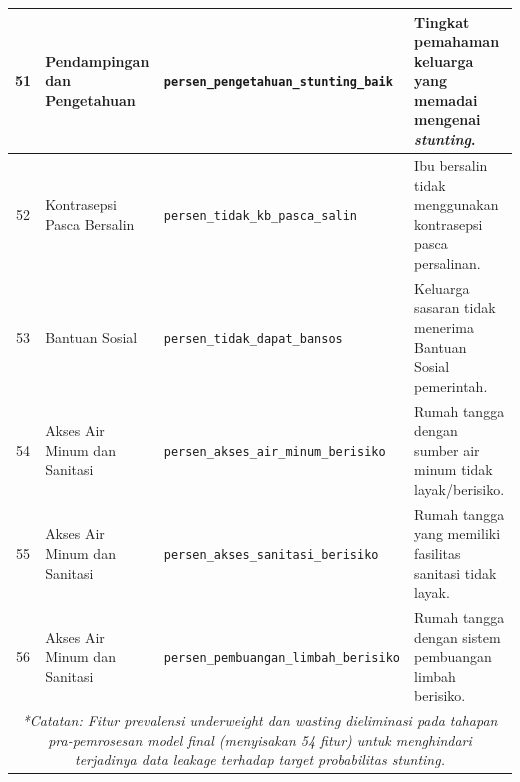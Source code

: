 \begin{longtable}{|c|p{}|p{}|p{}|}
    51 & Pendampingan dan Pengetahuan & \texttt{persen\_\allowbreak pengetahuan\_\allowbreak stunting\_\allowbreak baik} & Tingkat pemahaman keluarga yang memadai mengenai \textit{stunting}. \tabularnewline \hline
    52 & Kontrasepsi Pasca Bersalin & \texttt{persen\_\allowbreak tidak\_\allowbreak kb\_\allowbreak pasca\_\allowbreak salin} & Ibu bersalin tidak menggunakan kontrasepsi pasca persalinan. \tabularnewline \hline
    53 & Bantuan Sosial & \texttt{persen\_\allowbreak tidak\_\allowbreak dapat\_\allowbreak bansos} & Keluarga sasaran tidak menerima Bantuan Sosial pemerintah. \tabularnewline \hline
    54 & Akses Air Minum dan Sanitasi & \texttt{persen\_\allowbreak akses\_\allowbreak air\_\allowbreak minum\_\allowbreak berisiko} & Rumah tangga dengan sumber air minum tidak layak/berisiko. \tabularnewline \hline
    55 & Akses Air Minum dan Sanitasi & \texttt{persen\_\allowbreak akses\_\allowbreak sanitasi\_\allowbreak berisiko} & Rumah tangga yang memiliki fasilitas sanitasi tidak layak. \tabularnewline \hline
    56 & Akses Air Minum dan Sanitasi & \texttt{persen\_\allowbreak pembuangan\_\allowbreak limbah\_\allowbreak berisiko} & Rumah tangga dengan sistem pembuangan limbah berisiko. \tabularnewline \hline
    
    \multicolumn{4}{p{\textwidth}}{\footnotesize \textit{*Catatan: Fitur prevalensi underweight dan wasting dieliminasi pada tahapan pra-pemrosesan model final (menyisakan 54 fitur) untuk menghindari terjadinya data leakage terhadap target probabilitas stunting.}} \tabularnewline
\end{longtable}

\newpage
{} 
 \par
\vspace{0.5cm}

